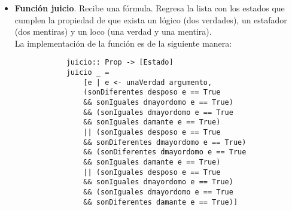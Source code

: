 \documentclass[letterpaper,12pt]{article}
\begin{document}
\begin{itemize}
        \item \textbf{Función juicio}. Recibe una fórmula. Regresa la lista 
        con los estados que cumplen la propiedad de que exista un lógico 
        (dos verdades), un estafador (dos mentiras) y un loco (una verdad y
        una mentira). \\
        La implementación de la función es de la siguiente manera:
        \begin{lstlisting}
            juicio:: Prop -> [Estado]
            juicio _ = 
                [e | e <- unaVerdad argumento, 
                (sonDiferentes desposo e == True 
                && sonIguales dmayordomo e == True) 
                && (sonIguales dmayordomo e == True 
                && sonIguales damante e == True)
                || (sonIguales desposo e == True 
                && sonDiferentes dmayordomo e == True) 
                && (sonDiferentes dmayordomo e == True 
                && sonIguales damante e == True)
                || (sonIguales desposo e == True 
                && sonIguales dmayordomo e == True) 
                && (sonIguales dmayordomo e == True 
                && sonDiferentes damante e == True)]
        \end{lstlisting}


\end{itemize}
\end{document}

